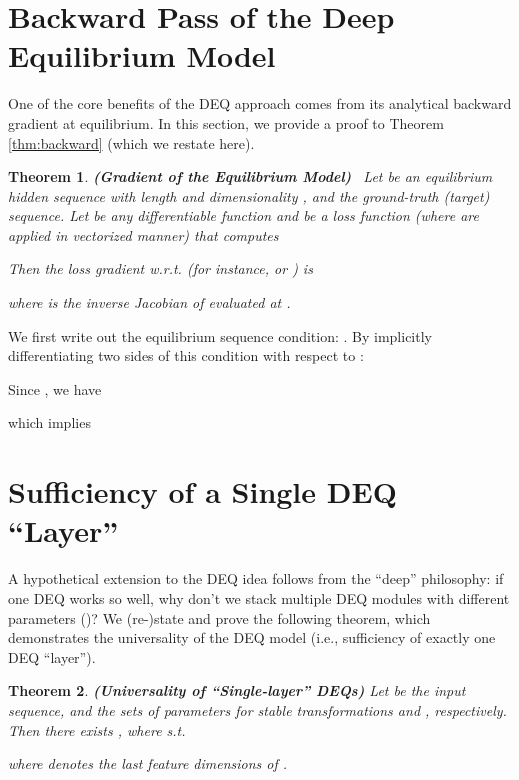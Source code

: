 \documentclass{article}
\newtheorem{apptheorem}{Theorem}
\newenvironment{proofidx}[1]{\renewcommand{\proofname}{Proof of Theorem #1}\proof}{\endproof}
\begin{document}
{\small


}

\appendix

\newpage

\section{Backward Pass of the Deep Equilibrium Model}
\label{app:backward-proof}

One of the core benefits of the DEQ approach comes from its analytical backward gradient at equilibrium. In this section, we provide a proof to Theorem \ref{thm:backward} (which we restate here).

\begin{apptheorem}
\textbf{(Gradient of the Equilibrium Model)} \ Let  be an equilibrium hidden sequence with length  and dimensionality , and  the ground-truth (target) sequence. Let  be any differentiable function and  be a loss function (where  are applied in vectorized manner) that computes

Then the loss gradient w.r.t.  (for instance,  or ) is

where  is the inverse Jacobian of  evaluated at .
\end{apptheorem}

\begin{proofidx}{\ref{thm:backward}}
We first write out the equilibrium sequence condition: . By implicitly differentiating two sides of this condition with respect to :


Since , we have

which implies

\end{proofidx}

\section{Sufficiency of a Single DEQ ``Layer''}
\label{app:sufficiency-proof}

A hypothetical extension to the DEQ idea follows from the ``deep'' philosophy: if one DEQ works so well, why don't we stack multiple DEQ modules with different parameters  ()? We (re-)state and prove the following theorem, which demonstrates the universality of the DEQ model (i.e., sufficiency of exactly one DEQ ``layer'').

\begin{apptheorem}
\textbf{(Universality of ``Single-layer'' DEQs)} Let  be the input sequence, and  the sets of parameters for stable transformations  and , respectively. Then there exists , where  s.t.

where  denotes the last  feature dimensions of .
\end{apptheorem}
\end{document}
